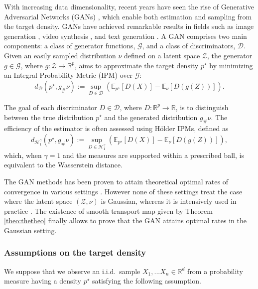 \documentclass{article}
\begin{document}
With increasing data dimensionality, recent years have seen the rise of Generative Adversarial Networks (GANs) \citep{goodfellow2014generative}, which enable both estimation and sampling from the target density. GANs have achieved remarkable results in fields such as image generation \citep{karras2021}, video synthesis \citep{vondrick2016generating}, and text generation \citep{SeqGANs}. A GAN comprises two main components: a class of generator functions, \( \mathcal{G} \), and a class of discriminators, \( \mathcal{D} \). Given an easily sampled distribution \( \nu \) defined on a latent space \( \mathcal{Z} \), the generator \( g \in \mathcal{G} \), where \( g: \mathcal{Z} \rightarrow \mathbb{R}^p \), aims to approximate the target density \( p^\star \) by minimizing an Integral Probability Metric (IPM) \citep{IPMsMuller} over \( \mathcal{G} \):
\begin{equation}\label{eq:IPM}
  d_{\mathcal{D}}(p^\star, g_{\# }\nu) := \sup_{D \in \mathcal{D}} \left( \mathbb{E}_{p^\star}[D(X)] - \mathbb{E}_\nu[D(g(Z))] \right).  
\end{equation}


The goal of each discriminator \( D \in \mathcal{D} \), where \( D: \mathbb{R}^p \rightarrow \mathbb{R} \), is to distinguish between the true distribution \( p^\star \) and the generated distribution \( g_{\# }\nu \). The efficiency of the estimator is often assessed using Hölder IPMs, defined as
\[
d_{\mathcal{H}_1^\gamma}(p^\star, g_{\# }\nu) := \sup_{D \in \mathcal{H}_1^\gamma} \left( \mathbb{E}_{p^\star}[D(X)] - \mathbb{E}_\nu[D(g(Z))] \right),
\]
which, when \( \gamma = 1 \) and the measures are supported within a prescribed ball, is equivalent to the Wasserstein distance.


The GAN methods has been proven to attain theoretical optimal rates of convergence in various settings \citep{belomestny2023rates, liang2021generative,stephanovitch2023wasserstein}. However none of these settings treat the case where the latent space $(\mathcal{Z},\nu)$ is Gaussian, whereas it is intensively used in practice \citep{goodfellow2014generative,biau2020some,wang2017generative}. The existence of smooth transport map given by Theorem \ref{theo:thetheo} finally allows to prove that the GAN attains optimal rates in the Gaussian setting.


\subsubsection{Assumptions on the target density}
We suppose that we observe an i.i.d.~sample $X_1,...X_n\in \mathbb{R}^d$ from a probability measure having a density $p^\star$ satisfying the following assumption.
\end{document}
